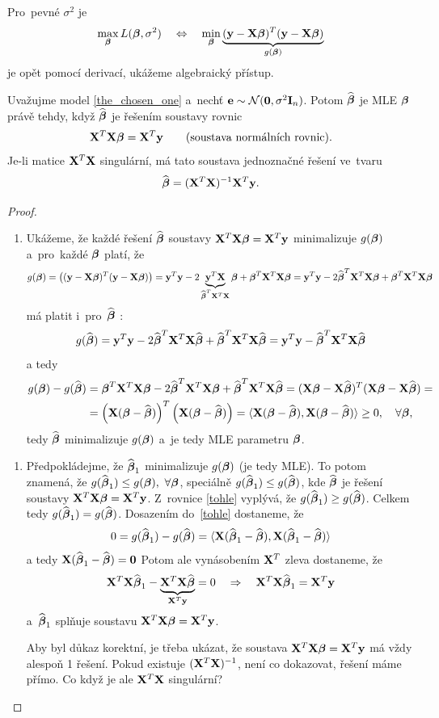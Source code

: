  Pro~pevné $\sigma^2$ je
 $$ \max_{\betab} L(\betab,\sigma^2)\quad\Leftrightarrow\quad\min_{\betab}\underbrace{(\y-\X\betab)^T(\y-\X\betab)}_{g(\betab)} $$
 je opět pomocí derivací, ukážeme algebraický přístup.

\newpage
 \begin{theorem}
 	Uvažujme model \eqref{the_chosen_one} a~nechť $\eb\sim\NN(\nula,\sigma^2 \In)$. Potom $\wbetab$ je MLE $\betab$ právě tehdy, když $\wbetab$ je řešením soustavy rovnic
 	 $$ \X^T\X\betab = \X^T\y\qquad\text{(soustava normálních rovnic)}. $$
 	Je-li matice $\X^T\X$ singulární, má tato soustava jednoznačné řešení ve~tvaru
 	 $$ \wbetab = (\X^T\X)^{-1}\X^T\y. $$
 	\begin{proof}
 		\begin{enumerate}[$\Leftarrow$]
 			\item Ukážeme, že každé řešení $\wbetab$ soustavy $\X^T\X\betab = \X^T\y$ minimalizuje $g(\betab)$ a~pro~každé $\betab$ platí, že
 			 $$ g(\bbeta) = \left((\y-\X\betab)^T(\y-\X\betab)\right) = \y^T\y-2\underbrace{\y^T\X}_{\wbetab^T\X^T\X}\betab+\betab^T\X^T\X\betab = \y^T\y-2\wbetab^T\X^T\X\betab+\betab^T\X^T\X\betab $$
 			má platit i~pro~$\wbetab$ :
 			 $$ g(\wbetab) = \y^T\y-2\wbetab^T\X^T\X\wbetab+\wbetab^T\X^T\X\wbetab = \y^T\y-\wbetab^T\X^T\X\wbetab $$
 			a tedy
 			\begin{align}
 			g(\bbeta)-g(\wbetab)& = \betab^T\X^T\X\betab-2\wbetab^T\X^T\X\betab+\wbetab^T\X^T\X\wbetab = (\X\betab-\X\wbetab)^T(\X\betab-\X\wbetab) = \\
 			&= \left(\X(\betab-\wbetab) \right)^T\left(\X(\betab-\wbetab) \right) = \langle \X(\betab-\wbetab),\X(\betab-\wbetab) \rangle\geq 0,\quad\forall\betab, \label{tohle}
 			\end{align}
 			 tedy $\wbetab$ minimalizuje $g(\bbeta)$ a~je tedy MLE parametru $\betab$.
 		\end{enumerate}
 	\begin{enumerate}[$\Rightarrow$]
 		\item Předpokládejme, že $\wbetab_1$ minimalizuje $g(\betab)$ (je tedy MLE). To potom znamená, že \linebreak $g(\wbetab_1)\leq g(\betab),~\forall \betab$, speciálně $g(\wbetab_1)\leq g(\wbetab)$, kde $\wbetab$ je řešení soustavy $\X^T\X\betab = \X^T\y$. Z~rovnice \eqref{tohle} vyplývá, že $g(\wbetab_1)\geq g(\wbetab)$. Celkem tedy $g(\wbetab_1) = g(\wbetab)$. Dosazením do~\eqref{tohle} dostaneme, že
 		 $$ 0 = g(\wbetab_1)-g(\wbetab) = \langle \X(\wbetab_1-\wbetab),\X(\wbetab_1-\wbetab) \rangle $$
 		a tedy $\X(\wbetab_1-\wbetab) = \nula$ Potom ale vynásobením $\X^T$ zleva dostaneme, že
 		 $$ \X^T\X\wbetab_1 - \underbrace{\X^T\X\wbetab}_{\X^T\y} = 0\quad\Rightarrow\quad \X^T\X\wbetab_1 = \X^T\y $$
 		 a~$\wbetab_1$ splňuje soustavu $\X^T\X\betab = \X^T\y$.
 		
 		Aby byl důkaz korektní, je třeba ukázat, že soustava $\X^T\X\betab = \X^T\y$ má vždy alespoň 1 řešení. Pokud existuje $(\X^T\X)^{-1}$, není co dokazovat, řešení máme přímo. Co když je ale $\X^T\X$ singulární?
 	\end{enumerate}
 	\end{proof}
 \end{theorem}
